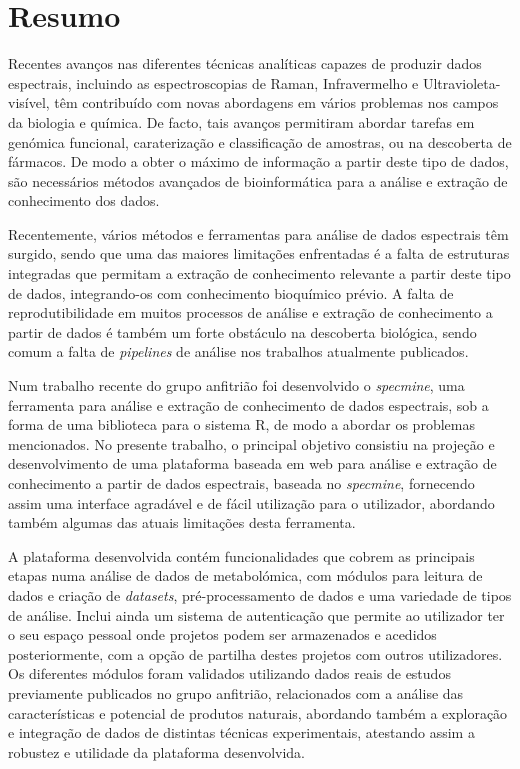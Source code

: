 \cleardoublepage

\chapter*{Resumo}

Recentes avanços nas diferentes técnicas analíticas capazes de produzir dados espectrais, incluindo as espectroscopias de Raman, Infravermelho e Ultravioleta-visível, têm contribuído com novas abordagens em vários problemas nos campos da biologia e química. De facto, tais avanços permitiram abordar tarefas em genómica funcional, caraterização e classificação de amostras, ou na descoberta de fármacos. De modo a obter o máximo de informação a partir deste tipo de dados, são necessários métodos avançados de bioinformática para a análise e extração de conhecimento dos dados.

Recentemente, vários métodos e ferramentas para análise de dados espectrais têm surgido, sendo que uma das maiores limitações enfrentadas é a falta de estruturas integradas que permitam a extração de conhecimento relevante a partir deste tipo de dados, integrando-os com conhecimento bioquímico prévio. A falta de reprodutibilidade em muitos processos de análise e extração de conhecimento a partir de dados é também um forte obstáculo na descoberta biológica, sendo comum a falta de \textit{pipelines} de análise nos trabalhos atualmente publicados.

Num trabalho recente do grupo anfitrião foi desenvolvido o \textit{specmine}, uma ferramenta para análise e extração de conhecimento de dados espectrais, sob a forma de uma biblioteca para o sistema R, de modo a abordar os problemas mencionados. No presente trabalho, o principal objetivo consistiu na projeção e desenvolvimento de uma plataforma baseada em web para análise e extração de conhecimento a partir de dados espectrais, baseada no \textit{specmine}, fornecendo assim uma interface agradável e de fácil utilização para o utilizador, abordando também algumas das atuais limitações desta ferramenta.

A plataforma desenvolvida contém funcionalidades que cobrem as principais etapas numa análise de dados de metabolómica, com módulos para leitura de dados e criação de \textit{datasets}, pré-processamento de dados e uma variedade de tipos de análise. Inclui ainda um sistema de autenticação que permite ao utilizador ter o seu espaço pessoal onde projetos podem ser armazenados e acedidos posteriormente, com a opção de partilha destes projetos com outros utilizadores. Os diferentes módulos foram validados utilizando dados reais de estudos previamente publicados no grupo anfitrião, relacionados com a análise das características e potencial de produtos naturais, abordando também a exploração e integração de dados de distintas técnicas experimentais, atestando assim a robustez e utilidade da plataforma desenvolvida.





